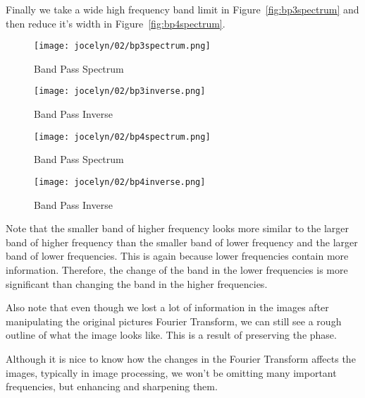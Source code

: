 \documentclass [../article.tex]{subfiles}
\begin{document}
  Finally we take a wide high frequency band limit in
  Figure~\ref{fig:bp3spectrum} and then reduce it's width
  in Figure~\ref{fig:bp4spectrum}.
  \begin{figure}[htbp]
      \texttt{[image: jocelyn/02/bp3spectrum.png]}
      \caption{Band Pass Spectrum}
      \label{fig:bp3spectrum}
    \endminipage\hfill
      \texttt{[image: jocelyn/02/bp3inverse.png]}
      \caption{Band Pass Inverse}
      \label{fig:bp3inverse}
    \endminipage
  \end{figure}
  \begin{figure}[htbp]
      \texttt{[image: jocelyn/02/bp4spectrum.png]}
      \caption{Band Pass Spectrum}
      \label{fig:bp4spectrum}
    \endminipage\hfill
      \texttt{[image: jocelyn/02/bp4inverse.png]}
      \caption{Band Pass Inverse}
      \label{fig:bp4inverse}
    \endminipage
  \end{figure}

  Note that the smaller band of higher frequency looks more similar
  to the larger band of higher frequency than the smaller band of
  lower frequency and the larger band of lower frequencies.  This is
  again because lower frequencies contain more information.
  Therefore, the change of the band in the lower frequencies is more
  significant than changing the band in the higher frequencies.

  Also note that even though we lost a lot of information in the
  images after manipulating the original pictures Fourier Transform,
  we can still see a rough outline of what the image looks like.
  This is a result of preserving the phase.

  Although it is nice to know how the changes in the Fourier
  Transform affects the images, typically in image processing, we
  won’t be omitting many important frequencies, but enhancing and
  sharpening them.
\end{document}
